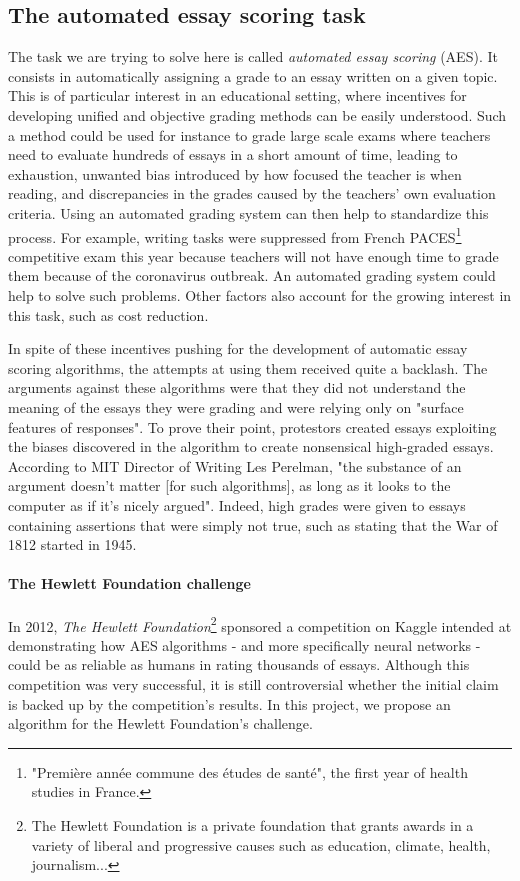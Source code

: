 \documentclass[a4paper,12pt,english]{article}
\begin{document}
\subsection{The automated essay scoring task}
The task we are trying to solve here is called \emph{automated essay scoring} (AES). It consists in automatically assigning a grade to an essay written on a given topic. This is of particular interest in an educational setting, where incentives for developing unified and objective grading methods can be easily understood. Such a method could be used for instance to grade large scale exams where teachers need to evaluate hundreds of essays in a short amount of time, leading to exhaustion, unwanted bias introduced by how focused the teacher is when reading, and discrepancies in the grades caused by the teachers' own evaluation criteria. Using an automated grading system can then help to standardize this process. For example, writing tasks were suppressed from French PACES\footnote{"Première année commune des études de santé", the first year of health studies in France.} competitive exam this year because teachers will not have enough time to grade them because of the coronavirus outbreak\cite{paces}. An automated grading system could help to solve such problems. Other factors also account for the growing interest in this task, such as cost reduction.\par
In spite of these incentives pushing for the development of automatic essay scoring algorithms, the attempts at using them received quite a backlash. The arguments against these algorithms were that they did not understand the meaning of the essays they were grading and were relying only on "surface features of responses". To prove their point, protestors created essays exploiting the biases discovered in the algorithm to create nonsensical high-graded essays. According to MIT Director of Writing Les Perelman, "the substance of an argument doesn’t matter [for such algorithms], as long as it looks to the computer as if it’s nicely argued"\cite{nyt2012}. Indeed, high grades were given to essays containing assertions that were simply not true, such as stating that the War of 1812 started in 1945.
\paragraph{The Hewlett Foundation challenge} In 2012, \emph{The Hewlett Foundation}\footnote{The Hewlett Foundation is a private foundation that grants awards in a variety of liberal and progressive causes such as education, climate, health, journalism...} sponsored a competition on Kaggle\cite{kaggle} intended at demonstrating how AES algorithms - and more specifically neural networks - could be as reliable as humans in rating thousands of essays. Although this competition was very successful\cite{nguyen2018neural,song2013automated,turanga,chanakya}, it is still controversial whether the initial claim is backed up by the competition's results. In this project, we propose an algorithm for the Hewlett Foundation's challenge.
\end{document}
